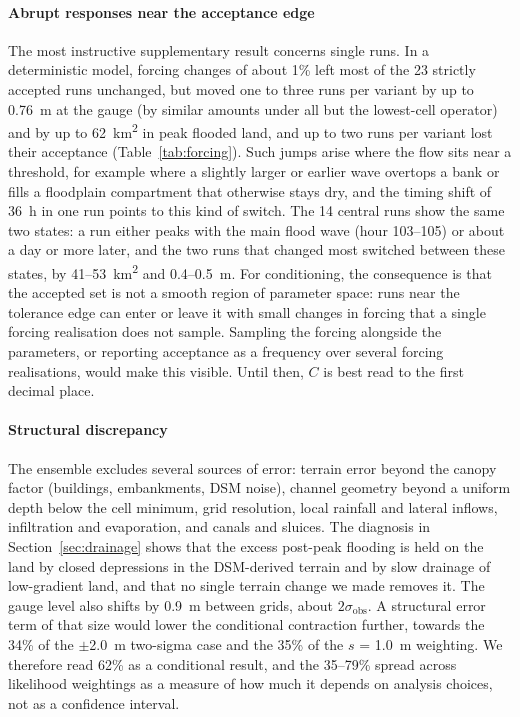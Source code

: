 \documentclass[preprint,12pt,authoryear]{elsarticle}
\newcommand{\kmsq}{km\textsuperscript{2}}
\begin{document}
\paragraph{Abrupt responses near the acceptance edge}
The most instructive supplementary result concerns single runs. In a deterministic model, forcing changes of about 1\% left most of the 23 strictly accepted runs unchanged, but moved one to three runs per variant by up to 0.76~m at the gauge (by similar amounts under all but the lowest-cell operator) and by up to 62~\kmsq{} in peak flooded land, and up to two runs per variant lost their acceptance (Table~\ref{tab:forcing}). Such jumps arise where the flow sits near a threshold, for example where a slightly larger or earlier wave overtops a bank or fills a floodplain compartment that otherwise stays dry, and the timing shift of 36~h in one run points to this kind of switch. The 14 central runs show the same two states: a run either peaks with the main flood wave (hour 103--105) or about a day or more later, and the two runs that changed most switched between these states, by 41--53~\kmsq{} and 0.4--0.5~m. For conditioning, the consequence is that the accepted set is not a smooth region of parameter space: runs near the tolerance edge can enter or leave it with small changes in forcing that a single forcing realisation does not sample. Sampling the forcing alongside the parameters, or reporting acceptance as a frequency over several forcing realisations, would make this visible. Until then, $C$ is best read to the first decimal place.

\paragraph{Structural discrepancy}
The ensemble excludes several sources of error: terrain error beyond the canopy factor (buildings, embankments, DSM noise), channel geometry beyond a uniform depth below the cell minimum, grid resolution, local rainfall and lateral inflows, infiltration and evaporation, and canals and sluices. The diagnosis in Section~\ref{sec:drainage} shows that the excess post-peak flooding is held on the land by closed depressions in the DSM-derived terrain and by slow drainage of low-gradient land, and that no single terrain change we made removes it. The gauge level also shifts by 0.9~m between grids, about $2\sigma_\mathrm{obs}$. A structural error term of that size would lower the conditional contraction further, towards the 34\% of the $\pm$2.0~m two-sigma case and the 35\% of the $s$ = 1.0~m weighting. We therefore read 62\% as a conditional result, and the 35--79\% spread across likelihood weightings as a measure of how much it depends on analysis choices, not as a confidence interval.
\end{document}

